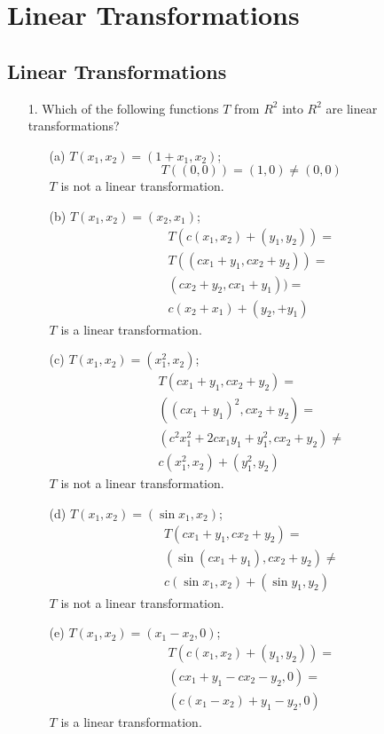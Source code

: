 \documentclass{article}
\begin{document}
\setcounter{section}{2}
\section{Linear Transformations}

\subsection{Linear Transformations}
\begin{enumerate}[listparindent=\parindent]
\item[1.] Which of the following functions \(T\) from \(R^2\) into \(R^2\) are linear transformations?
    \begin{enumerate}[listparindent=\parindent]
        \item[(a)] \(T(x_1, x_2) = (1 + x_1, x_2)\);
            \[ T((0, 0)) = (1, 0) \neq (0, 0)\]
            \(T\) is not a linear transformation.
        \item[(b)] \(T(x_1, x_2) = (x_2, x_1)\);
            \begin{gather*}
                T(c(x_1, x_2) + (y_1, y_2)) = \\
                T((cx_1 + y_1, cx_2 + y_2)) = \\
                (cx_2 + y_2, cx_1 + y_1)) = \\
                c(x_2 + x_1) + (y_2, + y_1)
            \end{gather*}
            \(T\) is a linear transformation.
        \item[(c)] \(T(x_1, x_2) = (x_1^2, x_2)\);
            \begin{gather*}
                T(cx_1 + y_1, cx_2 + y_2) = \\
                ((cx_1 + y_1)^2, cx_2 + y_2) = \\
                (c^2x_1^2 + 2cx_1y_1 + y_1^2, cx_2 + y_2) \neq \\
                c(x_1^2, x_2) + (y_1^2, y_2)
            \end{gather*}
            \(T\) is not a linear transformation.
        \item[(d)] \(T(x_1, x_2) = (\sin x_1, x_2)\);
            \begin{gather*}
                T(cx_1 + y_1, cx_2 + y_2) = \\
                (\sin(cx_1 + y_1), cx_2 + y_2) \neq \\
                c(\sin x_1, x_2) + (\sin y_1, y_2)
            \end{gather*}
            \(T\) is not a linear transformation.
        \item[(e)] \(T(x_1, x_2) = (x_1 - x_2, 0)\);
            \begin{gather*}
                T(c(x_1, x_2) + (y_1, y_2)) = \\
                (cx_1 + y_1 - cx_2 - y_2, 0) = \\
                (c(x_1 - x_2) + y_1 - y_2, 0)
            \end{gather*}
            \(T\) is a linear transformation.
    \end{enumerate}


\end{enumerate}
\end{document}

